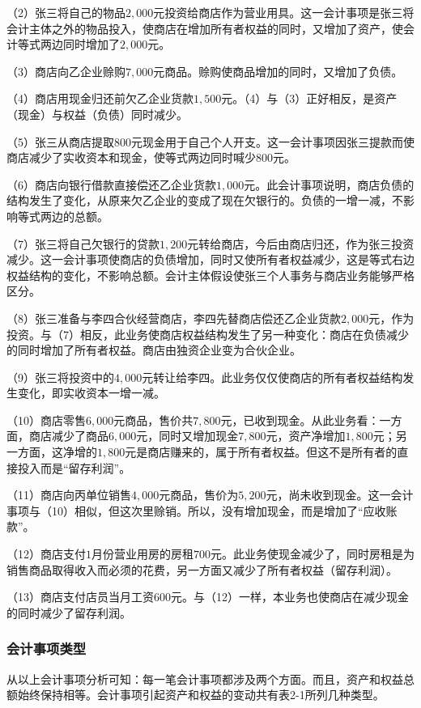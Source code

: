 		（2）张三将自己的物品$2,000$元投资给商店作为营业用具。这一会计事项是张三将会计主体之外的物品投入，使商店在增加所有者权益的同时，又增加了资产，使会计等式两边同时增加了$2,000$元。

		（3）商店向乙企业赊购$7,000$元商品。赊购使商品增加的同时，又增加了负债。

		（4）商店用现金归还前欠乙企业货款$1,500$元。（4）与（3）正好相反，是资产（现金）与权益（负债）同时减少。

		（5）张三从商店提取$800$元现金用于自己个人开支。这一会计事项因张三提款而使商店减少了实收资本和现金，使等式两边同时喊少$800$元。

		（6）商店向银行借款直接偿还乙企业货款$1,000$元。此会计事项说明，商店负债的结构发生了变化，从原来欠乙企业的变成了现在欠银行的。负债的一增一减，不影响等式两边的总额。

		（7）张三将自己欠银行的贷款$1,200$元转给商店，今后由商店归还，作为张三投资减少。这一会计事项使商店的负债增加，同时又使所有者权益减少，这是等式右边权益结构的变化，不影响总额。会计主体假设使张三个人事务与商店业务能够严格区分。

		（8）张三准备与李四合伙经营商店，李四先替商店偿还乙企业货款$2,000$元，作为投资。与（7）相反，此业务使商店权益结构发生了另一种变化：商店在负债减少的同时增加了所有者权益。商店由独资企业变为合伙企业。

		（9）张三将投资中的$4,000$元转让给李四。此业务仅仅使商店的所有者权益结构发生变化，即实收资本一增一减。

		（10）商店零售$6,000$元商品，售价共$7,800$元，已收到现金。从此业务看：一方面，商店减少了商品$6,000$元，同时又增加现金$7,800$元，资产净增加$1,800$元；另一方面，这净增的$1,800$元是商店赚来的，属于所有者权益。但这不是所有者的直接投入而是“留存利润”。

		（11）商店向丙单位销售$4,000$元商品，售价为$5,200$元，尚未收到现金。这一会计事项与（10）相似，但这次里赊销。所以，没有增加现金，而是增加了“应收账款”。

		（12）商店支付$1$月份营业用房的房租$700$元。此业务使现金减少了，同时房租是为销售商品取得收入而必须的花费，另一方面又减少了所有者权益（留存利润）。

		（13）商店支付店员当月工资$600$元。与（12）一样，本业务也使商店在减少现金的同时减少了留存利润。

		\subsubsection{会计事项类型}

		从以上会计事项分析可知：每一笔会计事项都涉及两个方面。而且，资产和权益总额始终保持相等。会计事项引起资产和权益的变动共有表2-1所列几种类型。









